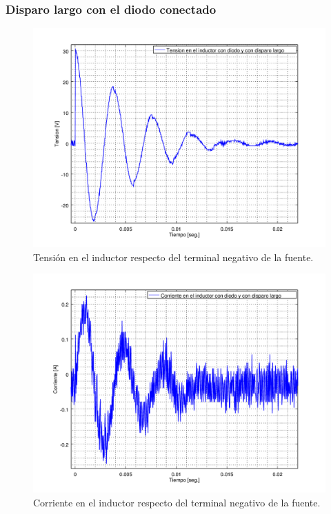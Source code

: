\documentclass[10pt,spanish,a4paper,openany,notitlepage]{article}
\begin{document}
\subsubsection{Disparo largo con el diodo conectado}

\begin{figure}[H]
\centering
\includegraphics[scale=0.65]{./Octave/tiristores/V_L_con_diodo_disparo_largo.png}
\caption{Tensión en el inductor respecto del terminal negativo de la fuente.}
\label{fig:V_con_diodo_largo}
\end{figure}

\begin{figure}[H]
\centering
\includegraphics[scale=0.65]{./Octave/tiristores/I_L_con_diodo_disparo_largo.png}
\caption{Corriente en el inductor respecto del terminal negativo de la fuente.}
\label{fig:I_con_diodo_largo}
\end{figure}
\end{document}
